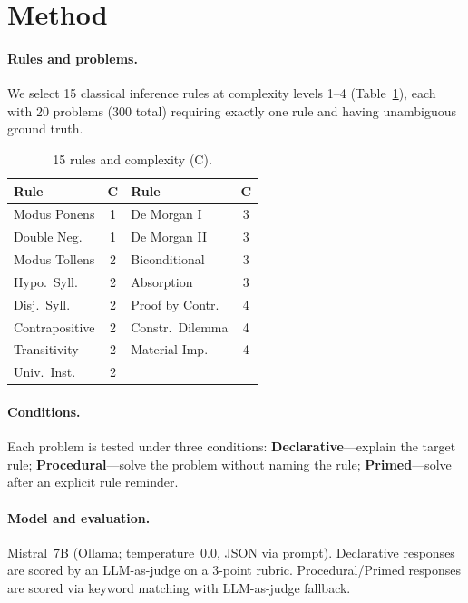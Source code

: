 \documentclass[11pt]{article}
\begin{document}
\section{Method}

\paragraph{Rules and problems.}
We select 15 classical inference rules at complexity levels 1--4
(Table~\ref{tab:rules}), each with 20 problems (300 total) requiring
exactly one rule and having unambiguous ground truth.

\begin{table}[t]
\centering
\small
\begin{tabular}{lc|lc}
\toprule
\textbf{Rule} & \textbf{C} & \textbf{Rule} & \textbf{C} \\
\midrule
Modus Ponens & 1 & De Morgan I & 3 \\
Double Neg. & 1 & De Morgan II & 3 \\
Modus Tollens & 2 & Biconditional & 3 \\
Hypo.\ Syll. & 2 & Absorption & 3 \\
Disj.\ Syll. & 2 & Proof by Contr. & 4 \\
Contrapositive & 2 & Constr.\ Dilemma & 4 \\
Transitivity & 2 & Material Imp. & 4 \\
Univ.\ Inst. & 2 & & \\
\bottomrule
\end{tabular}
\caption{15 rules and complexity (C).}
\label{tab:rules}
\end{table}

\paragraph{Conditions.}
Each problem is tested under three conditions:
\textbf{Declarative}---explain the target rule;
\textbf{Procedural}---solve the problem without naming the rule;
\textbf{Primed}---solve after an explicit rule reminder.

\paragraph{Model and evaluation.}
Mistral~7B (Ollama; temperature~0.0, JSON via prompt).
Declarative responses are scored by an LLM-as-judge on a 3-point
rubric.
Procedural/Primed responses are scored via keyword matching with
LLM-as-judge fallback.
\end{document}
